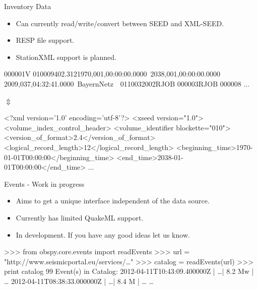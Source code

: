 \documentclass[handout]{beamer}
\begin{document}
\begin{frame}{Inventory Data}
    \begin{itemize}
        \item Can currently read/write/convert between SEED and XML-SEED.
        \item RESP file support.
        \item StationXML support is planned.
    \end{itemize}


\footnotesize
\begin{myColorBox}{0.95}{}
\begin{semiverbatim}
000001V 010009402.3121970,001,00:00:00.0000~2038,001,00:00:00.0000~
2009,037,04:32:41.0000~BayernNetz~~0110032002RJOB 000003RJOB 000008
...
\end{semiverbatim}
\end{myColorBox}

\large
\begin{center}
    $\Updownarrow$
\end{center}

\footnotesize


\begin{myColorBox}{0.95}{}
\begin{semiverbatim}
<?xml version='1.0' encoding='utf-8'?>
<xseed version="1.0">
  <volume_index_control_header>
    <volume_identifier blockette="010">
      <version_of_format>2.4</version_of_format>
      <logical_record_length>12</logical_record_length>
      <beginning_time>1970-01-01T00:00:00</beginning_time>
      <end_time>2038-01-01T00:00:00</end_time>
...
\end{semiverbatim}
\end{myColorBox}

\normalsize

\end{frame}

\begin{frame}{Events - Work in progress}
    \begin{itemize}
        \item Aims to get a unique interface independent of the data source.
        \item Currently has limited QuakeML support.
        \item In development. If you have any good ideas let us know.
    \end{itemize}
\begin{myColorBox}{0.95}{}
\begin{semiverbatim}
>>> from obspy.core.events import readEvents
>>> url = "http://www.seismicportal.eu/services/\dots"
>>> catalog = readEvents(url)
>>> print catalog
99 Event(s) in Catalog:
2012-04-11T10:43:09.400000Z |  \dots | 8.2 Mw | \dots
2012-04-11T08:38:33.000000Z |  \dots | 8.4 M  | \dots
\dots
\end{semiverbatim}
\end{myColorBox}
\end{frame}
\end{document}
